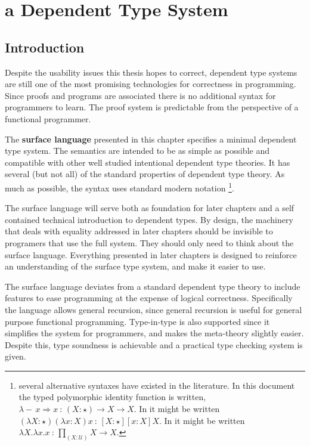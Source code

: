 \chapter{a Dependent Type System}
\label{chapter:Surface}
\thispagestyle{myheadings}

\section{Introduction}

Despite the usability issues this thesis hopes to correct, dependent type systems are still one of the most promising technologies for correctness in programming.
Since proofs and programs are associated there is no additional syntax for programmers to learn.
The proof system is predictable from the perspective of a functional programmer.

The \textbf{surface language} presented in this chapter specifies a minimal dependent type system.
The semantics are intended to be as simple as possible and compatible with other well studied intentional dependent type theories.
It has several (but not all) of the standard properties of dependent type theory.
As much as possible, the syntax uses standard modern notation \footnote{several alternative syntaxes have existed in the literature.
In this document the typed polymorphic identity function is written, $\lambda-\,x\Rightarrow x\ :\,\left(X:\star\right)\rightarrow X\rightarrow X$.
In \cite{10.1016/0890-5401(88)90005-3} it might be written $\left(\lambda X:\star\right)\left(\lambda x:X\right)x\ :\,\left[X:\star\right]\left[x:X\right]X$.
In \cite{HoTTbook} it might be written $\lambda X.\lambda x.x\ :\,\underset{\left(X:\mathcal{U}\right)}{\prod}X\rightarrow X$.}.


The surface language will serve both as foundation for later chapters and a self contained technical introduction to dependent types.
By design, the machinery that deals with equality addressed in later chapters should be invisible to programers that use the full system.
They should only need to think about the surface language.
Everything presented in later chapters is designed to reinforce an understanding of the surface type system, and make it easier to use.


The surface language deviates from a standard dependent type theory to include features to ease programming at the expense of logical correctness.
Specifically the language allows general recursion, since general recursion is useful for general purpose functional programming.
Type-in-type is also supported since it simplifies the system for programmers, and makes the meta-theory slightly easier.
Despite this, type soundness is achievable and a practical type checking system is given.

